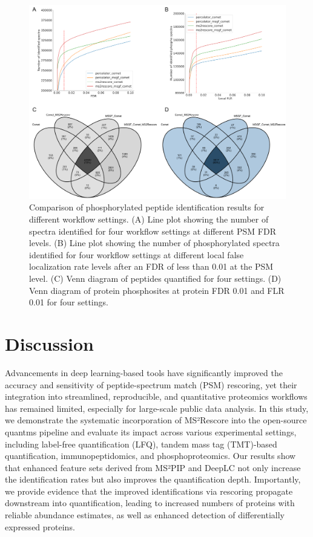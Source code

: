 \documentclass[12pt]{article}
\begin{document}
\begin{figure}[ht!]
	\centering
	\includegraphics[width=1\textwidth]{figures//phospho2.png}
	\caption{Comparison of phosphorylated peptide identification results for different workflow settings. (A) Line plot showing the number of spectra identified for four workflow settings at different PSM FDR levels. (B) Line plot showing the number of phosphorylated spectra identified for four workflow settings at different local false localization rate levels after an FDR of less than 0.01 at the PSM level. (C) Venn diagram of peptides quantified for four settings. (D) Venn diagram of protein phosphosites at protein FDR 0.01 and FLR 0.01 for four settings.}
	\label{fig:PXD026824_ms2rescore}
\end{figure}

\section{Discussion}
Advancements in deep learning-based tools have significantly improved the accuracy and sensitivity of peptide-spectrum match (PSM) rescoring, yet their integration into streamlined, reproducible, and quantitative proteomics workflows has remained limited, especially for large-scale public data analysis. In this study, we demonstrate the systematic incorporation of MS²Rescore into the open-source quantms pipeline and evaluate its impact across various experimental settings, including label-free quantification (LFQ), tandem mass tag (TMT)-based quantification, immunopeptidomics, and phosphoproteomics. Our results show that enhanced feature sets derived from MS²PIP and DeepLC not only increase the identification rates but also improves the quantification depth. Importantly, we provide evidence that the improved identifications via rescoring propagate downstream into quantification, leading to increased numbers of proteins with reliable abundance estimates, as well as enhanced detection of differentially expressed proteins.
\end{document}
